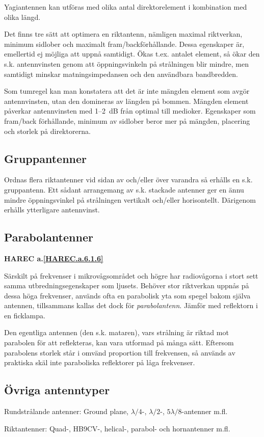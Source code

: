 Yagiantennen kan utföras med olika antal direktorelement i kombination med
olika längd.

Det finns tre sätt att optimera en riktantenn, nämligen maximal
riktverkan, minimum sidlober och maximalt fram/backförhållande.
Dessa egenskaper är, emellertid ej möjliga att uppnå samtidigt.
Ökas t.ex. antalet element, så ökar den s.k. antennvinsten genom att
öppningsvinkeln på strålningen blir mindre, men samtidigt minskar
matningsimpedansen och den användbara bandbredden.

Som tumregel kan man konstatera att det är inte mängden element som
avgör antennvinsten, utan den domineras av längden på bommen.
Mängden element påverkar antennvinsten med 1--2~dB från optimal till
medioker.
Egenskaper som fram/back förhållande, minimum av sidlober beror mer
på mängden, placering och storlek på direktorerna.

\subsection{Gruppantenner}

Ordnas flera riktantenner vid sidan av och/eller över varandra så
erhålls en s.k. gruppantenn.
Ett sådant arrangemang av s.k. stackade antenner ger en ännu mindre
öppningsvinkel på strålningen vertikalt och/eller horisontellt.
Därigenom erhålls ytterligare antennvinst.

\subsection{Parabolantenner}
\textbf{
HAREC a.\ref{HAREC.a.6.1.6}\label{myHAREC.a.6.1.6}
}

Särskilt på frekvenser i mikrovågsområdet och högre har radiovågorna i
stort sett samma utbredningsegenskaper som ljusets.
Behöver stor riktverkan uppnås på dessa höga frekvenser, används ofta en
parabolisk yta som spegel bakom själva antennen, tillsammans kallas det dock
för \emph{parabolantenn}.
Jämför med reflektorn i en ficklampa.

Den egentliga antennen (den s.k. mataren), vars strålning är riktad
mot parabolen för att reflekteras, kan vara utformad på många sätt.
Eftersom parabolens storlek står i omvänd proportion till frekvensen, så
används av praktiska skäl inte paraboliska reflektorer på låga frekvenser.

\subsection{Övriga antenntyper}

Rundstrålande antenner: Ground plane, \(\lambda/4\)-, \(\lambda/2\)-,
\(5\lambda/8\)-antenner m.fl.

Riktantenner: Quad-, HB9CV-, helical-, parabol- och hornantenner m.fl.
